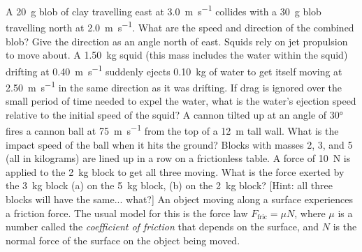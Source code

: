 \documentclass[a4paper]{exam}
\begin{document}
  \begin{questions}
    \question A \SI{20}{\gram} blob of clay travelling east at \SI{3.0}{\metre\per\second} collides with a \SI{30}{\gram} blob travelling
              north at \SI{2.0}{\metre\per\second}. What are the speed and direction of the combined blob? Give the direction as an angle
              north of east.
    \question Squids rely on jet propulsion to move about. A \SI{1.50}{\kilo\gram} squid (this mass includes the water within the squid) drifting
              at \SI{0.40}{\metre\per\second} suddenly ejects \SI{0.10}{\kilo\gram} of water to get itself moving at \SI{2.50}{\metre\per\second}
              in the same direction as it was drifting. If drag is ignored over the small period of time needed to expel the water, what is the
              water's ejection speed relative to the initial speed of the squid?
    \question A cannon tilted up at an angle of \ang{30} fires a cannon ball at \SI{75}{\metre\per\second} from the top of a \SI{12}{\metre} tall
              wall. What is the impact speed of the ball when it hits the ground?
    \question Blocks with masses 2, 3, and 5 (all in kilograms) are lined up in a row on a frictionless table. A force of \SI{10}{\newton}
              is applied to the \SI{2}{\kilo\gram} block to get all three moving. What is the force exerted by the \SI{3}{\kilo\gram} block (a) on
              the \SI{5}{\kilo\gram} block, (b) on the \SI{2}{\kilo\gram} block? [Hint: all three blocks will have the same... what?]
    \question An object moving along a surface experiences a friction force. The usual model for this is the force law $ F_\text{fric} = \mu N $,
              where $ \mu $ is a number called the \emph{coefficient of friction} that depends on the surface, and $ N $ is the normal force
              of the surface on the object being moved.
\end{questions}
\end{document}
